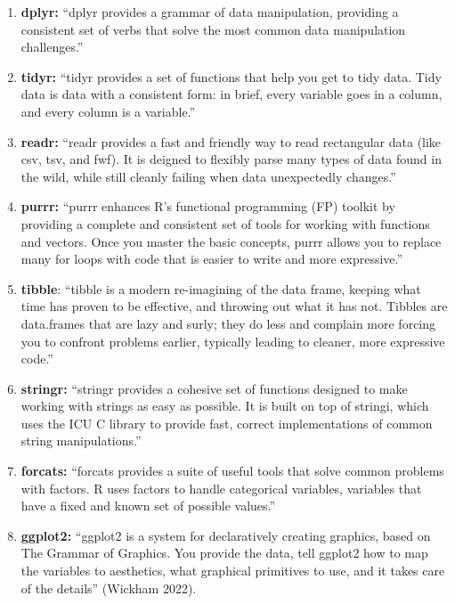 \documentclass[
  letterpaper,
]{krantz}
\providecommand{\tightlist}{%
  \setlength{\itemsep}{0pt}\setlength{\parskip}{0pt}}\usepackage{longtable,booktabs,array}
\begin{document}
\begin{enumerate}
\def\labelenumi{\arabic{enumi}.}
\tightlist
\item
  \textbf{dplyr:} ``dplyr provides a grammar of data manipulation,
  providing a consistent set of verbs that solve the most common data
  manipulation challenges.''
\item
  \textbf{tidyr:} ``tidyr provides a set of functions that help you get
  to tidy data. Tidy data is data with a consistent form: in brief,
  every variable goes in a column, and every column is a variable.''
\item
  \textbf{readr:} ``readr provides a fast and friendly way to read
  rectangular data (like csv, tsv, and fwf). It is deigned to flexibly
  parse many types of data found in the wild, while still cleanly
  failing when data unexpectedly changes.''
\item
  \textbf{purrr:} ``purrr enhances R's functional programming (FP)
  toolkit by providing a complete and consistent set of tools for
  working with functions and vectors. Once you master the basic
  concepts, purrr allows you to replace many for loops with code that is
  easier to write and more expressive.''
\item
  \textbf{tibble}: ``tibble is a modern re-imagining of the data frame,
  keeping what time has proven to be effective, and throwing out what it
  has not. Tibbles are data.frames that are lazy and surly; they do less
  and complain more forcing you to confront problems earlier, typically
  leading to cleaner, more expressive code.''
\item
  \textbf{stringr:} ``stringr provides a cohesive set of functions
  designed to make working with strings as easy as possible. It is built
  on top of stringi, which uses the ICU C library to provide fast,
  correct implementations of common string manipulations.''
\item
  \textbf{forcats:} ``forcats provides a suite of useful tools that
  solve common problems with factors. R uses factors to handle
  categorical variables, variables that have a fixed and known set of
  possible values.''
\item
  \textbf{ggplot2:} ``ggplot2 is a system for declaratively creating
  graphics, based on The Grammar of Graphics. You provide the data, tell
  ggplot2 how to map the variables to aesthetics, what graphical
  primitives to use, and it takes care of the details'' (Wickham 2022).
\end{enumerate}
\end{document}
